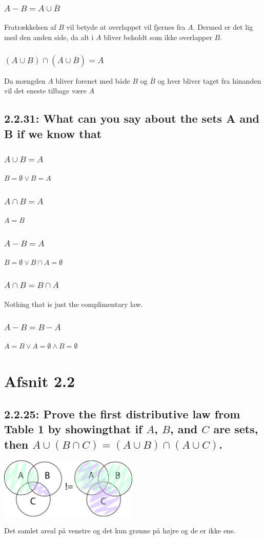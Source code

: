 \documentclass[12pt, a4paper]{report}
\begin{document}
					\subsubsection{$A-B=A\cup \overline{B}$}
						Fratrækkelsen af $B$ vil betyde at overlappet vil fjernes fra $A$. Dermed er det lig med den anden side, da alt i $A$ bliver beholdt som ikke overlapper $B$.
					\subsubsection{$(A\cup B)\cap (A\cup \overline{B})=A$}
						Da mængden $A$ bliver forenet med både $B$ og $\overline{B}$ og hver bliver taget fra hinanden vil det eneste tilbage være $A$
				\setcounter{subsection}{30}
				\subsection{2.2.31: What can you say about the sets A and B if we know that}
					\subsubsection{$A\cup B=A$}
						$B=\emptyset \lor B=A$ 	
					\subsubsection{$A\cap B=A$}
						$A=B$
					\subsubsection{$A-B=A$}
						$B=\emptyset \lor B\cap A = \emptyset$
					\subsubsection{$A\cap B=B\cap A$}
						Nothing that is just the complimentary law.
					\subsubsection{$A-B=B-A$}
						$A=B \lor A=\emptyset \land B=\emptyset$
			\setcounter{section}{0}
			\section{Afsnit 2.2}
				\setcounter{subsection}{24}
				\subsection{2.2.25: Prove the first distributive law from Table 1 by showingthat if $A$, $B$, and $C$ are sets, then $A \cup (B \cap C) = (A\cup B) \cap (A \cup C)$.}
					\begin{center}
						\includegraphics[width=250px]{assets/2.25.png}
					\end{center}
				Det samlet areal på venstre og det kun grønne på højre og de er ikke ens.
\end{document}
